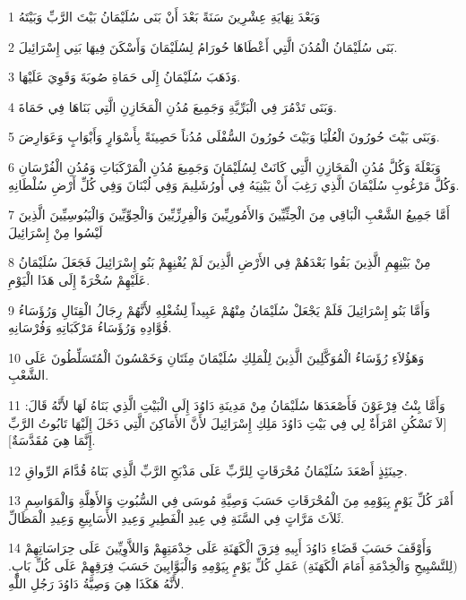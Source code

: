 \par 1 وَبَعْدَ نِهَايَةِ عِشْرِينَ سَنَةً بَعْدَ أَنْ بَنَى سُلَيْمَانُ بَيْتَ الرَّبِّ وَبَيْتَهُ
\par 2 بَنَى سُلَيْمَانُ الْمُدُنَ الَّتِي أَعْطَاهَا حُورَامُ لِسُلَيْمَانَ وَأَسْكَنَ فِيهَا بَنِي إِسْرَائِيلَ.
\par 3 وَذَهَبَ سُلَيْمَانُ إِلَى حَمَاةِ صُوبَةَ وَقَوِيَ عَلَيْهَا.
\par 4 وَبَنَى تَدْمُرَ فِي الْبَرِّيَّةِ وَجَمِيعَ مُدُنِ الْمَخَازِنِ الَّتِي بَنَاهَا فِي حَمَاةَ.
\par 5 وَبَنَى بَيْتَ حُورُونَ الْعُلْيَا وَبَيْتَ حُورُونَ السُّفْلَى مُدُناً حَصِينَةً بِأَسْوَارٍ وَأَبْوَابٍ وَعَوَارِضَ.
\par 6 وَبَعْلَةَ وَكُلَّ مُدُنِ الْمَخَازِنِ الَّتِي كَانَتْ لِسُلَيْمَانَ وَجَمِيعَ مُدُنِ الْمَرْكَبَاتِ وَمُدُنِ الْفُرْسَانِ وَكُلَّ مَرْغُوبِ سُلَيْمَانَ الَّذِي رَغِبَ أَنْ يَبْنِيَهُ فِي أُورُشَلِيمَ وَفِي لُبْنَانَ وَفِي كُلِّ أَرْضِ سُلْطَانِهِ.
\par 7 أَمَّا جَمِيعُ الشَّعْبِ الْبَاقِي مِنَ الْحِثِّيِّينَ وَالأَمُورِيِّينَ وَالْفِرِزِّيِّينَ وَالْحِوِّيِّينَ وَالْيَبُوسِيِّينَ الَّذِينَ لَيْسُوا مِنْ إِسْرَائِيلَ
\par 8 مِنْ بَيْنِهِمِ الَّذِينَ بَقُوا بَعْدَهُمْ فِي الأَرْضِ الَّذِينَ لَمْ يُفْنِهِمْ بَنُو إِسْرَائِيلَ فَجَعَلَ سُلَيْمَانُ عَلَيْهِمْ سُخْرَةً إِلَى هَذَا الْيَوْمِ.
\par 9 وَأَمَّا بَنُو إِسْرَائِيلَ فَلَمْ يَجْعَلْ سُلَيْمَانُ مِنْهُمْ عَبِيداً لِشُغْلِهِ لأَنَّهُمْ رِجَالُ الْقِتَالِ وَرُؤَسَاءُ قُوَّادِهِ وَرُؤَسَاءُ مَرْكَبَاتِهِ وَفُرْسَانِهِ.
\par 10 وَهَؤُلاَءِ رُؤَسَاءُ الْمُوَكَّلِينَ الَّذِينَ لِلْمَلِكِ سُلَيْمَانَ مِئَتَانِ وَخَمْسُونَ الْمُتَسَلِّطُونَ عَلَى الشَّعْبِ.
\par 11 وَأَمَّا بِنْتُ فِرْعَوْنَ فَأَصْعَدَهَا سُلَيْمَانُ مِنْ مَدِينَةِ دَاوُدَ إِلَى الْبَيْتِ الَّذِي بَنَاهُ لَهَا لأَنَّهُ قَالَ: [لاَ تَسْكُنِ امْرَأَةٌ لِي فِي بَيْتِ دَاوُدَ مَلِكِ إِسْرَائِيلَ لأَنَّ الأَمَاكِنَ الَّتِي دَخَلَ إِلَيْهَا تَابُوتُ الرَّبِّ إِنَّمَا هِيَ مُقَدَّسَةٌ].
\par 12 حِينَئِذٍ أَصْعَدَ سُلَيْمَانُ مُحْرَقَاتٍ لِلرَّبِّ عَلَى مَذْبَحِ الرَّبِّ الَّذِي بَنَاهُ قُدَّامَ الرِّواقِ.
\par 13 أَمْرَ كُلِّ يَوْمٍ بِيَوْمِهِ مِنَ الْمُحْرَقَاتِ حَسَبَ وَصِيَّةِ مُوسَى فِي السُّبُوتِ وَالأَهِلَّةِ وَالْمَوَاسِمِ ثَلاَثَ مَرَّاتٍ فِي السَّنَةِ فِي عِيدِ الْفَطِيرِ وَعِيدِ الأَسَابِيعِ وَعِيدِ الْمَظَالِّ.
\par 14 وَأَوْقَفَ حَسَبَ قَضَاءِ دَاوُدَ أَبِيهِ فِرَقَ الْكَهَنَةِ عَلَى خِدْمَتِهِمْ وَاللاَّوِيِّينَ عَلَى حِرَاسَاتِهِمْ (لِلتَّسْبِيحِ وَالْخِدْمَةِ أَمَامَ الْكَهَنَةِ) عَمَلِ كُلِّ يَوْمٍ بِيَوْمِهِ وَالْبَوَّابِينَ حَسَبَ فِرَقِهِمْ عَلَى كُلِّ بَابٍ. لأَنَّهُ هَكَذَا هِيَ وَصِيَّةُ دَاوُدَ رَجُلِ اللَّهِ.
